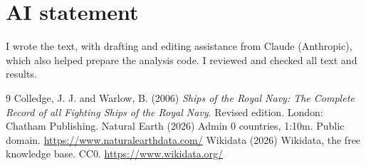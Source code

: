 \documentclass[11pt,a4paper]{article}
\begin{document}
\section*{AI statement}
I wrote the text, with drafting and editing assistance from Claude (Anthropic), which also helped prepare the analysis code. I reviewed and checked all text and results.

\begin{thebibliography}{9}
 Colledge, J. J. and Warlow, B. (2006) \textit{Ships of the Royal Navy: The Complete Record of all Fighting Ships of the Royal Navy}. Revised edition. London: Chatham Publishing.
 Natural Earth (2026) Admin 0 countries, 1:10m. Public domain. \url{https://www.naturalearthdata.com/}
 Wikidata (2026) Wikidata, the free knowledge base. CC0. \url{https://www.wikidata.org/}
\end{thebibliography}

\appendix
\end{document}
